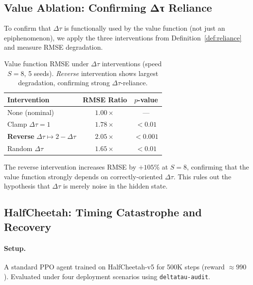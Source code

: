 \documentclass[10pt,twocolumn]{article}
\newcommand{\deltatau}{\Delta\tau}
\theoremstyle{plain}
\theoremstyle{definition}
\begin{document}
\subsection{Value Ablation: Confirming Δτ Reliance}
\label{sec:exp_ablation_value}

To confirm that $\deltatau$ is functionally used by the value function
(not just an epiphenomenon), we apply the three interventions from
Definition~\ref{def:reliance} and measure RMSE degradation.

\begin{table}[h]
\centering
\caption{Value function RMSE under $\deltatau$ interventions (speed $S=8$,
5 seeds). \emph{Reverse} intervention shows largest degradation, confirming
strong $\deltatau$-reliance.}
\label{tab:ablation_value}
\small
\begin{tabular}{lcc}
\toprule
Intervention & RMSE Ratio & $p$-value \\
\midrule
None (nominal) & $1.00\times$ & --- \\
Clamp $\deltatau = 1$ & $1.78\times$ & $<0.01$ \\
\textbf{Reverse} $\deltatau \mapsto 2 - \deltatau$ & $\mathbf{2.05\times}$ & $\mathbf{<0.001}$ \\
Random $\deltatau$ & $1.65\times$ & $<0.01$ \\
\bottomrule
\end{tabular}
\vspace{-0.5em}
\end{table}

The reverse intervention increases RMSE by $+105\%$ at $S=8$, confirming that
the value function strongly depends on correctly-oriented $\deltatau$. This rules
out the hypothesis that $\deltatau$ is merely noise in the hidden state.

\subsection{HalfCheetah: Timing Catastrophe and Recovery}
\label{sec:exp_halfcheetah}

\paragraph{Setup.}
A standard PPO agent \cite{schulman2017proximal} trained on HalfCheetah-v5
for 500K steps (reward $\approx 990$). Evaluated under four deployment scenarios
using \texttt{deltatau-audit}.
\end{document}
